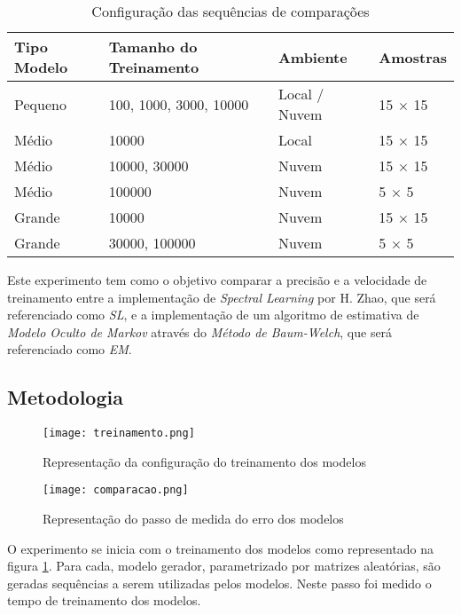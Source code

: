 \documentclass{subfiles}
\begin{document}
\begin{table*} 
    \caption{Configuração das sequências de comparações}
    \centering
    \begin{tabular}{l l l l}
        \toprule
        Tipo Modelo & Tamanho do Treinamento & Ambiente & Amostras \\
        \midrule
        Pequeno & 100, 1000, 3000, 10000 & Local / Nuvem & 15 $\times$ 15 \\
        Médio & 10000 & Local & 15 $\times$ 15 \\
        Médio & 10000, 30000 & Nuvem & 15 $\times$ 15 \\
        Médio & 100000 & Nuvem & 5 $\times$ 5 \\
        Grande & 10000 & Nuvem & 15 $\times$ 15 \\
        Grande & 30000, 100000 & Nuvem & 5 $\times$ 5 \\
        \bottomrule
    \end{tabular}
    \label{tab:config}
\end{table*}

Este experimento tem como o objetivo comparar a precisão e a velocidade de treinamento entre a implementação de \textit{Spectral Learning} por H. Zhao, que será referenciado como \textit{SL}, e a implementação de um algoritmo de estimativa de \textit{Modelo Oculto de Markov} através do \textit{Método de Baum-Welch}, que será referenciado como \textit{EM}.

\subsection{Metodologia}

\begin{figure}
    \texttt{[image: treinamento.png]}
    \caption{Representação da configuração do treinamento dos modelos}
    \label{fig:trein}
\end{figure}

\begin{figure}
    \texttt{[image: comparacao.png]}
    \caption{Representação do passo de medida do erro dos modelos}
    \label{fig:comp}
\end{figure}

O experimento se inicia com o treinamento dos modelos como representado na figura \ref{fig:trein}. Para cada, modelo gerador, parametrizado por matrizes aleatórias, são geradas sequências a serem utilizadas pelos modelos. Neste passo foi medido o tempo de treinamento dos modelos.
\end{document}
